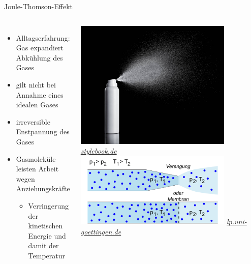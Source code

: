 \documentclass[aspectratio=1610, 9pt, xcolor=dvipsnames]{beamer}
\begin{document}
\begin{frame}{Joule-Thomson-Effekt}
  \begin{columns}
    \begin{itemize}
      \item Alltagserfahrung: Gas expandiert {\color{tugreen} \rightarrow} Abkühlung des Gases
      \item gilt nicht bei Annahme eines idealen Gases
      \item irreversible Enstpannung des Gases
      \item Gasmoleküle leisten Arbeit wegen Anziehungskräfte
      \begin{itemize}
        \item[\rightarrow] Verringerung der kinetischen Energie und damit der  Temperatur 
      \end{itemize}
    \end{itemize}
    \centering
  \includegraphics[width=0.8\textwidth]{Plots/deo.jpg}
  \hspace*{12pt}\hbox{\scriptsize {\footnotesize\itshape \href{https://www.stylebook.de/skincare/feinstaub-allergien-atemwege-wie-gesundheitsschaedlich-sind-deo-sprays}
  {stylebook.de}}}
  \vspace*{0.2cm}
  \includegraphics[width=0.8\textwidth]{Plots/ventil.png}
  \hspace*{12pt}\hbox{\scriptsize {\footnotesize\itshape \href{https://lp.uni-goettingen.de/get/text/719}
  {lp.uni-goettingen.de}}}
  \vspace*{0.2cm}
\end{columns}
\end{frame}
\end{document}
